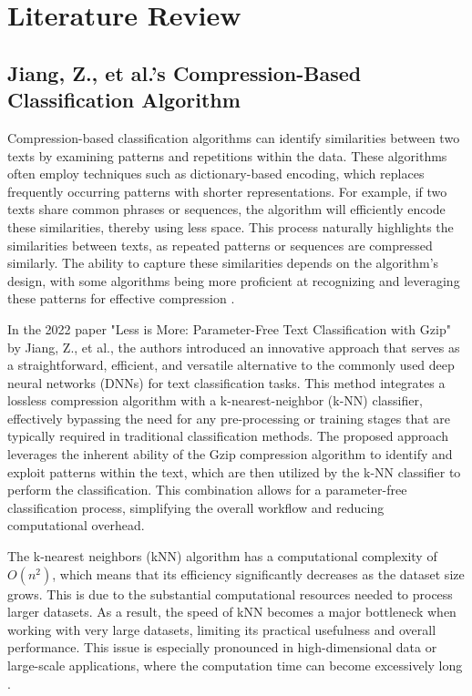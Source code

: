 \section{Literature Review}
\subsection{Jiang, Z., et al.’s Compression-Based Classification Algorithm}

Compression-based classification algorithms can identify similarities between two texts by examining patterns and repetitions within the data. These algorithms often employ techniques such as dictionary-based encoding, which replaces frequently occurring patterns with shorter representations. For example, if two texts share common phrases or sequences, the algorithm will efficiently encode these similarities, thereby using less space. This process naturally highlights the similarities between texts, as repeated patterns or sequences are compressed similarly. The ability to capture these similarities depends on the algorithm's design, with some algorithms being more proficient at recognizing and leveraging these patterns for effective compression \cite{Ozan2024}.

In the 2022 paper "Less is More: Parameter-Free Text Classification with Gzip" by Jiang, Z., et al., the authors introduced an innovative approach that serves as a straightforward, efficient, and versatile alternative to the commonly used deep neural networks (DNNs) for text classification tasks. This method integrates a lossless compression algorithm with a k-nearest-neighbor (k-NN) classifier, effectively bypassing the need for any pre-processing or training stages that are typically required in traditional classification methods. The proposed approach leverages the inherent ability of the Gzip compression algorithm to identify and exploit patterns within the text, which are then utilized by the k-NN classifier to perform the classification. This combination allows for a parameter-free classification process, simplifying the overall workflow and reducing computational overhead.

The k-nearest neighbors (kNN) algorithm has a computational complexity of  \(O(n^2)\), which means that its efficiency significantly decreases as the dataset size grows. This is due to the substantial computational resources needed to process larger datasets. As a result, the speed of kNN becomes a major bottleneck when working with very large datasets, limiting its practical usefulness and overall performance. This issue is especially pronounced in high-dimensional data or large-scale applications, where the computation time can become excessively long \cite{Jiang2023}.

